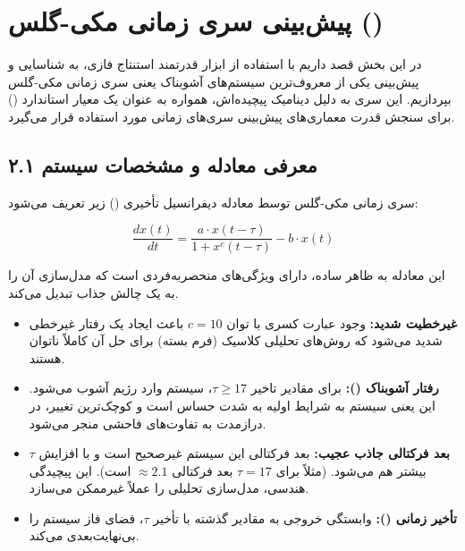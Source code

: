 \documentclass{article}
\begin{document}
\section{پیش‌بینی سری زمانی مکی-گلس ()}

در این بخش قصد داریم با استفاده از ابزار قدرتمند استنتاج فازی، به شناسایی و پیش‌بینی یکی از معروف‌ترین سیستم‌های آشوبناک یعنی سری زمانی مکی-گلس بپردازیم. این سری به دلیل دینامیک پیچیده‌اش، همواره به عنوان یک معیار استاندارد () برای سنجش قدرت معماری‌های پیش‌بینی سری‌های زمانی مورد استفاده قرار می‌گیرد.

\subsection{۲.۱ معرفی معادله و مشخصات سیستم}

سری زمانی مکی-گلس توسط معادله دیفرانسیل تأخیری () زیر تعریف می‌شود:

$$ \frac{dx(t)}{dt} = \frac{a \cdot x(t-\tau)}{1 + x^c(t-\tau)} - b \cdot x(t) $$

این معادله به ظاهر ساده، دارای ویژگی‌های منحصربه‌فردی است که مدل‌سازی آن را به یک چالش جذاب تبدیل می‌کند.

\begin{tcolorbox}[
	colback=lightmutedteal,
	colframe=mutedteal,
	title=ویژگی‌های کلیدی سیستم مکی-گلس,
	fonttitle=\bfseries\large,
	coltitle=white,
	arc=3mm
	]
	\begin{itemize}[label=\textcolor{mutedteal}{$\blacksquare$}, leftmargin=*]
		\item \textbf{غیرخطیت شدید:} وجود عبارت کسری با توان $c=10$ باعث ایجاد یک رفتار غیرخطی شدید می‌شود که روش‌های تحلیلی کلاسیک (فرم بسته) برای حل آن کاملاً ناتوان هستند.
		\item \textbf{رفتار آشوبناک ():} برای مقادیر تاخیر $\tau \ge 17$، سیستم وارد رژیم آشوب می‌شود. این یعنی سیستم به شرایط اولیه به شدت حساس است و کوچک‌ترین تغییر، در درازمدت به تفاوت‌های فاحشی منجر می‌شود.
		\item \textbf{بعد فرکتالی جاذب عجیب:} بعد فرکتالی این سیستم غیرصحیح است و با افزایش $\tau$ بیشتر هم می‌شود. (مثلاً برای $\tau=17$ بعد فرکتالی $\approx 2.1$ است). این پیچیدگی هندسی، مدل‌سازی تحلیلی را عملاً غیرممکن می‌سازد.
		\item \textbf{تأخیر زمانی ():} وابستگی خروجی به مقادیر گذشته با تأخیر $\tau$، فضای فاز سیستم را بی‌نهایت‌بعدی می‌کند.
	\end{itemize}
\end{tcolorbox}
\end{document}
